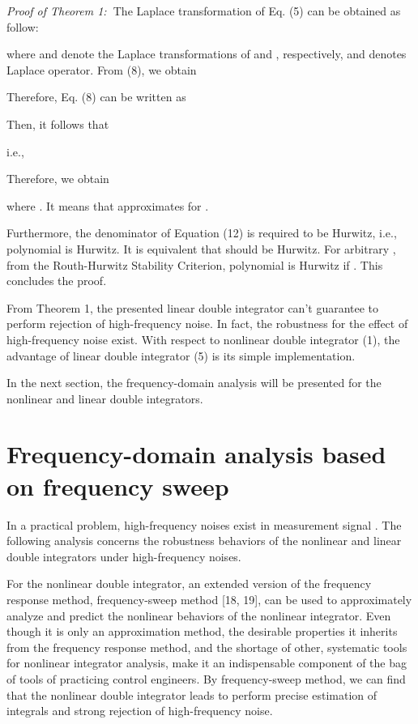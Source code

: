 \documentclass[10pt,journal]{IEEEtran}
\begin{document}
\emph{Proof of Theorem 1:}\textbf{\ }The Laplace transformation of Eq. (5)
can be obtained as follow:

where  and  denote the Laplace
transformations of  and , respectively, and 
denotes Laplace operator. From (8), we obtain



Therefore, Eq. (8) can be written as



Then, it follows that

i.e.,



Therefore, we obtain

where . It means that  approximates  for .

Furthermore, the denominator of Equation (12) is required to be Hurwitz,
i.e., polynomial  is Hurwitz.
It is equivalent that  should be Hurwitz. For arbitrary , from the Routh-Hurwitz Stability Criterion, polynomial  is Hurwitz if . This concludes the
proof. 

From Theorem 1, the presented linear double integrator can't guarantee to
perform rejection of high-frequency noise. In fact, the robustness for the
effect of high-frequency noise exist. With respect to nonlinear double
integrator (1), the advantage of linear double integrator (5) is its simple
implementation.

In the next section, the frequency-domain analysis will be presented for the
nonlinear and linear double integrators.

\section{Frequency-domain analysis based on frequency sweep}

In a practical problem, high-frequency noises exist in measurement signal . The following analysis concerns the robustness behaviors of the
nonlinear and linear double integrators under high-frequency noises.

For the nonlinear double integrator, an extended version of the frequency
response method, frequency-sweep method [18, 19], can be used to
approximately analyze and predict the nonlinear behaviors of the nonlinear
integrator. Even though it is only an approximation method, the desirable
properties it inherits from the frequency response method, and the shortage
of other, systematic tools for nonlinear integrator analysis, make it an
indispensable component of the bag of tools of practicing control engineers.
By frequency-sweep method, we can find that the nonlinear double integrator
leads to perform precise estimation of integrals and strong rejection of
high-frequency noise.
\end{document}
